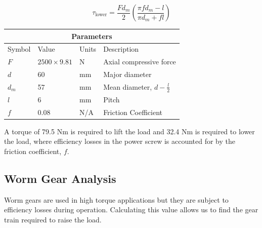 \documentclass[letterpaper,12pt]{article}
\begin{document}
\begin{equation}
\tau_{\text{lower}} = \frac{Fd_m}{2}\left(\frac{\pi f d_m-l}{\pi d_m + fl}\right)
\end{equation}


\begin{center}
	\begin{tabular}{ |p{2cm}||p{3cm}|p{2cm}|p{7cm}|  }
		\hline
		\multicolumn{4}{|c|}{Parameters} \\
		\hline
		Symbol& Value & Units & Description\\
		\hline
		$F$ & $2500 \times 9.81$ & N & Axial compressive force\\
        $d$ & 60 & mm   & Major diameter\\			
		$d_m$ & 57 & mm   & Mean diameter, $d - \frac{l}{2}$\\
		$l$ & 6 & mm &  Pitch\\
		$f$ & 0.08 & N/A & Friction Coefficient\\
		\hline
	\end{tabular}
\end{center}

A torque of 79.5 Nm is required to lift the load and 32.4 Nm is required to lower the load, where efficiency losses in the power screw is accounted for by the friction coefficient, $f$. 
    
\subsection{Worm Gear Analysis}
Worm gears are used in high torque applications but they are subject to efficiency losses during operation. Calculating this value allows us to find the gear train required to raise the load. \\
\end{document}
